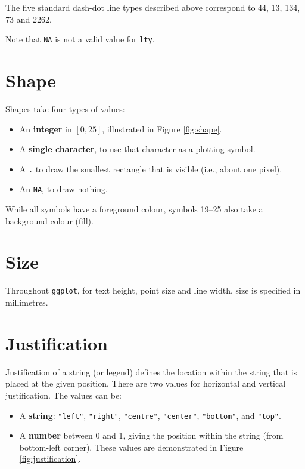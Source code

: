 The five standard dash-dot line types described above correspond to 44,
13, 134, 73 and 2262.

Note that \texttt{NA} is not a valid value for \texttt{lty}.

\section{Shape}\label{sec:shape-spec}

Shapes take four types of values: 

\begin{itemize}
\itemsep1pt\parskip0pt
\item
  An \textbf{integer} in \([0, 25]\), illustrated in Figure
  \ref{fig:shape}.
\item
  A \textbf{single character}, to use that character as a plotting
  symbol.
\item
  A \texttt{.} to draw the smallest rectangle that is visible (i.e.,
  about one pixel).
\item
  An \texttt{NA}, to draw nothing.
\end{itemize}

While all symbols have a foreground colour, symbols 19--25 also take a
background colour (fill).

\section{Size}\label{sec:size}

Throughout \texttt{ggplot}, for text height, point size and line width,
size is specified in millimetres. 

\section{Justification}\label{sec:justification-spec}

Justification of a string (or legend) defines the location within the
string that is placed at the given position. There are two values for
horizontal and vertical justification. The values can be:
  

\begin{itemize}
\itemsep1pt\parskip0pt
\item
  A \textbf{string}: \texttt{"left"}, \texttt{"right"},
  \texttt{"centre"}, \texttt{"center"}, \texttt{"bottom"}, and
  \texttt{"top"}.
\item
  A \textbf{number} between 0 and 1, giving the position within the
  string (from bottom-left corner). These values are demonstrated in
  Figure \ref{fig:justification}.
\end{itemize}

